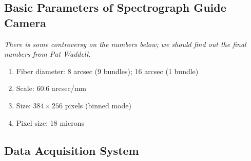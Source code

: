 \subsection{Basic Parameters of Spectrograph Guide Camera}
{\it There is some controversy on the numbers below; we should find
out the final numbers from Pat Waddell.}
\begin{enumerate}
\item Fiber diameter: 8 arcsec (9 bundles); 16 arcsec (1 bundle)

\item Scale: 60.6 arcsec/mm

\item Size: $384\times 256$ pixels (binned mode)

\item Pixel size: 18 microns
\end{enumerate}

\subsection{Data Acquisition System}

